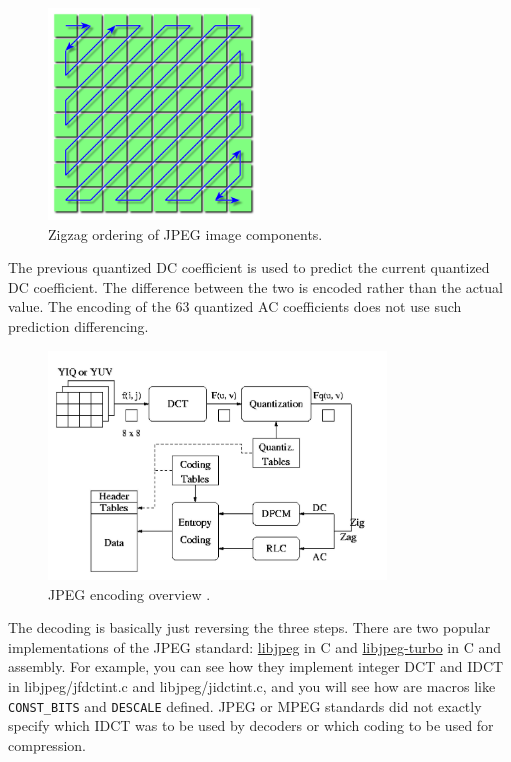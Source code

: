 \documentclass[a4paper,12pt,twoside]{article}
\begin{document}
\begin{itemize}
    \begin{figure}[H]
        \centering
        \includegraphics[width=0.5\textwidth]{images/21.png}
        \caption{Zigzag ordering of JPEG image components.}
    \end{figure}
    The previous quantized DC coefficient is used to predict the current quantized DC coefficient. The difference between the two is encoded rather than the actual value. The encoding of the 63 quantized AC coefficients does not use such prediction differencing.
\end{itemize}
\begin{figure}[H]
    \centering
    \includegraphics[width=0.8\textwidth]{images/23.jpg}
    \caption{JPEG encoding overview \cite{compression}.}
\end{figure}
The decoding is basically just reversing the three steps. There are two popular implementations of the JPEG standard: \href{https://github.com/LuaDist/libjpeg}{libjpeg} in C and \href{https://github.com/libjpeg-turbo/libjpeg-turbo}{libjpeg-turbo} in C and assembly. For example, you can see how they implement integer DCT and IDCT in libjpeg/jfdctint.c and libjpeg/jidctint.c, and you will see how are macros like \texttt{CONST\_BITS} and \texttt{DESCALE} defined. JPEG or MPEG standards did not exactly specify  which IDCT was to be used by decoders or which coding to be used for compression.
\end{document}
